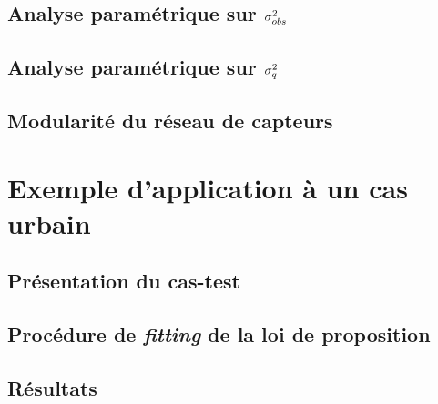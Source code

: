 \subsection{Analyse paramétrique sur ${\sigma_{obs}^2}$}

\subsection{Analyse paramétrique sur $\sigma_q^2$}

\subsection{Modularité du réseau de capteurs}

\section{Exemple d'application à un cas urbain}

\subsection{Présentation du cas-test}

\subsection{Procédure de \textit{fitting} de la loi de proposition}

\subsection{Résultats}





